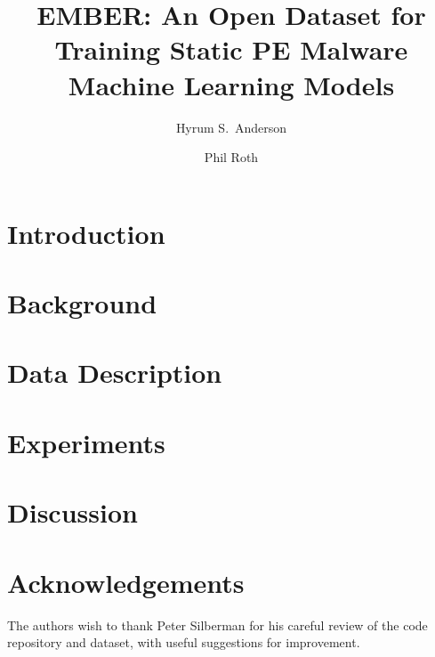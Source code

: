 \documentclass[sigconf]{acmart}
\begin{document}
\title{EMBER: An Open Dataset for Training Static PE Malware Machine Learning Models}

	\author{Hyrum S.~Anderson}

	\author{Phil Roth}
    

\begin{abstract}

\end{abstract}



\maketitle

\section{Introduction}
\label{sec:intro}


\section{Background}
\label{sec:background}


\pagebreak[3]
\section{Data Description}
\label{sec:method}


\section{Experiments}
\label{sec:results}


\section{Discussion}
\label{sec:conclusion}


\pagebreak[4]
\section*{Acknowledgements}
The authors wish to thank Peter Silberman for his careful review of the code repository and dataset, with useful suggestions for improvement.



\end{document}
